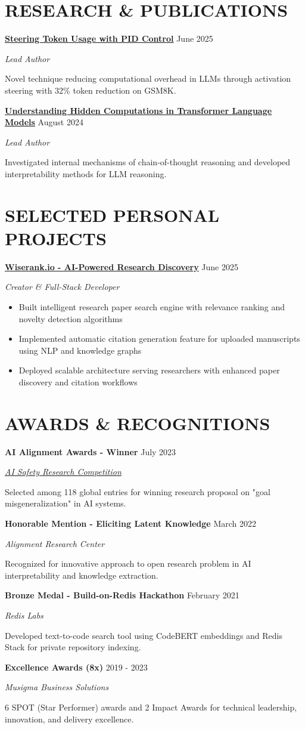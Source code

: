 \documentclass[fontsize=11pt]{article}
\newcommand{\NewPart}[1]{\section*{\uppercase{#1}}}
\newcommand{\ProjectEntry}[4]{
    \noindent \textbf{#1} \hfill {#2} \par
    \noindent \textit{#3} \par
    \noindent \small #4
    \normalsize \par}
\newcommand{\AwardEntry}[4]{
    \noindent \textbf{#1} \hfill {#2} \par
    \noindent \textit{#3} \par
    \noindent \small #4
    \normalsize \par}
\begin{document}
\NewPart{RESEARCH \& PUBLICATIONS}

\ProjectEntry{\href{https://arxiv.org/abs/2506.18831}{Steering Token Usage with PID Control}}{June 2025}{Lead Author}
{Novel technique reducing computational overhead in LLMs through activation steering with 32\% token reduction on GSM8K.}

\ProjectEntry{\href{https://arxiv.org/html/2412.04537}{Understanding Hidden Computations in Transformer Language Models}}{August 2024}{Lead Author}
{Investigated internal mechanisms of chain-of-thought reasoning and developed interpretability methods for LLM reasoning.}

\NewPart{SELECTED PERSONAL PROJECTS}
\ProjectEntry{\href{https://wiserank.io}{Wiserank.io - AI-Powered Research Discovery}}{June 2025}{Creator \& Full-Stack Developer}
{%
\begin{itemize}
\item Built intelligent research paper search engine with relevance ranking and novelty detection algorithms
\item Implemented automatic citation generation feature for uploaded manuscripts using NLP and knowledge graphs
\item Deployed scalable architecture serving researchers with enhanced paper discovery and citation workflows
\end{itemize}}

\NewPart{AWARDS \& RECOGNITIONS}

\AwardEntry{AI Alignment Awards - Winner}{July 2023}{\href{https://www.lesswrong.com/posts/zFoAAD7dfWdczxoLH/winners-of-ai-alignment-awards-research-contest}{AI Safety Research Competition}}
{Selected among 118 global entries for winning research proposal on "goal misgeneralization" in AI systems.}

\AwardEntry{Honorable Mention - Eliciting Latent Knowledge}{March 2022}{Alignment Research Center}
{Recognized for innovative approach to open research problem in AI interpretability and knowledge extraction.}

\AwardEntry{Bronze Medal - Build-on-Redis Hackathon}{February 2021}{Redis Labs}
{Developed text-to-code search tool using CodeBERT embeddings and Redis Stack for private repository indexing.}

\AwardEntry{Excellence Awards (8x)}{2019 - 2023}{Musigma Business Solutions}
{6 SPOT (Star Performer) awards and 2 Impact Awards for technical leadership, innovation, and delivery excellence.}
\end{document}
